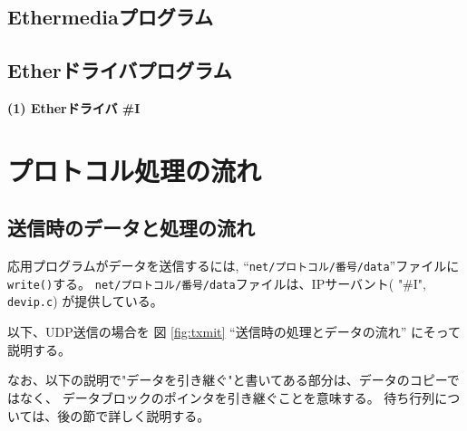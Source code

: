 \section{Ethermediaプログラム}

\vspace{4cm}

\section{Etherドライバプログラム}

{\bf \flushleft(1) Etherドライバ \#I}

\vspace{4cm}



\chapter{プロトコル処理の流れ}

\section{ 送信時のデータと処理の流れ}

      応用プログラムがデータを送信するには, 
      ``{\tt net/プロトコル/番号/data}''ファイルに{\tt write()}する。 
      {\tt net/プロトコル/番号/data}ファイルは、IPサーバント( "\#I", 
      {\tt devip.c}) が提供している。

      以下、UDP送信の場合を 図 \ref{fig:txmit}  ``送信時の処理とデータの流れ'' 
      にそって説明する。

      なお、以下の説明で"データを引き継ぐ"と書いてある部分は、データのコピーではなく、
      データブロックのポインタを引き継ぐことを意味する。
      待ち行列については、後の節で詳しく説明する。

